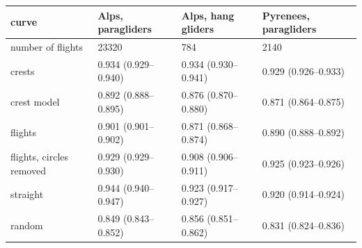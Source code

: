 \begin{tabular}{llll}
\toprule
curve & Alps, paragliders & Alps, hang gliders & Pyrenees, paragliders \\
\midrule
number of flights & 23320 & 784 & 2140 \\
crests & 0.934 (0.929--0.940) & 0.934 (0.930--0.941) & 0.929 (0.926--0.933) \\
crest model & 0.892 (0.888--0.895) & 0.876 (0.870--0.880) & 0.871 (0.864--0.875) \\
flights & 0.901 (0.901--0.902) & 0.871 (0.868--0.874) & 0.890 (0.888--0.892) \\
flights, circles removed & 0.929 (0.929--0.930) & 0.908 (0.906--0.911) & 0.925 (0.923--0.926) \\
straight & 0.944 (0.940--0.947) & 0.923 (0.917--0.927) & 0.920 (0.914--0.924) \\
random & 0.849 (0.843--0.852) & 0.856 (0.851--0.862) & 0.831 (0.824--0.836) \\
\bottomrule
\end{tabular}
